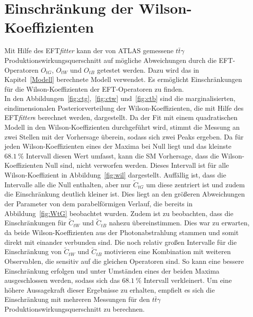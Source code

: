 \section{Einschränkung der Wilson-Koeffizienten}
Mit Hilfe des EFT\textit{fitter} kann der von ATLAS gemessene $t\bar{t}\gamma$ Produktionswirkungsquerschnitt auf mögliche Abweichungen durch die EFT-Operatoren $O_{tG}$, $O_{tW}$ und $O_{tB}$ getestet werden. Dazu wird das in Kapitel~\ref{Modell} berechnete Modell verwendet. Es ermöglicht Einschränkungen für die Wilson-Koeffizienten der EFT-Operatoren zu finden.\\
In den Abbildungen~\ref{fig:ctg},~\ref{fig:ctw} und~\ref{fig:ctb} sind die marginalisierten, eindimensionalen Posteriorverteilung der Wilson-Koeffizienten, die mit Hilfe des EFT\textit{fitter}s berechnet werden, dargestellt.
Da der Fit mit einem quadratischen Modell in den Wilson-Koeffizienten durchgeführt wird, stimmt die Messung an zwei Stellen mit der Vorhersage überein, sodass sich zwei Peaks ergeben.
Da für jeden Wilson-Koeffizienten eines der Maxima bei Null liegt und das kleinste $\SI{68.1}{\percent}$ Intervall diesen Wert umfasst, kann die SM Vorhersage, dass die Wilson-Koeffizienten Null sind, nicht verworfen werden.
Dieses Intervall ist für alle Wilson-Koeffizient in Abbildung~\ref{fig:wil} dargestellt. Auffällig ist, dass die Intervalle alle die Null enthalten, aber nur $\tilde{C}_{tG}$ um diese zentriert ist und zudem die Einschränkung deutlich kleiner ist.
Dies liegt an den größeren Abweichungen der Parameter von dem parabelförmigen Verlauf, die bereits in Abbildung~\ref{fig:WtG} beobachtet wurden.
Zudem ist zu beobachten, dass die Einschränkungen für $\tilde{C}_{tW}$ und $\tilde{C}_{tB}$ nahezu übereinstimmen.
Dies war zu erwarten, da beide Wilson-Koeffizienten aus der Photonabstrahlung stammen und somit direkt mit einander verbunden sind.
Die noch relativ großen Intervalle für die Einschränkung von $\tilde{C}_{tW}$ und $\tilde{C}_{tB}$ motivieren eine Kombination mit weiteren Observablen, die sensitiv auf die gleichen Operatoren sind. So kann eine bessere Einschränkung erfolgen und unter Umständen eines der beiden Maxima ausgeschlossen werden, sodass sich das $\SI{68.1}{\percent}$ Intervall verkleinert.
Um eine höhere Aussagekraft dieser Ergebnisse zu erhalten, empfielt es sich die Einschränkung mit mehreren Messungen für den $t\bar{t}\gamma$ Produktionswirkungsquerschnitt zu berechnen.
